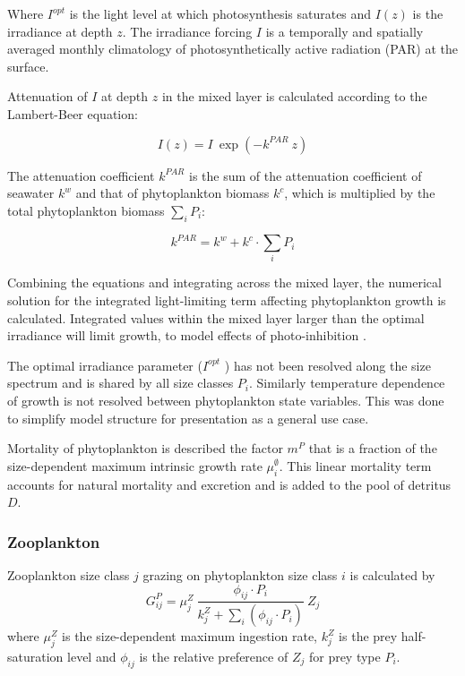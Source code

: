 \documentclass[journal abbreviations, manuscript]{copernicus}
\begin{document}
Where $I^{opt}$ is the light level at which photosynthesis saturates and $I(z)$ is the irradiance at depth $z$.
The irradiance forcing $I$ is a temporally and spatially averaged monthly climatology of photosynthetically active radiation (PAR) at the surface. 

Attenuation of $I$ at depth $z$ in the mixed layer is calculated according to the Lambert-Beer equation:

\begin{equation}
    I(z) = I \ \exp{(-k^{PAR} \ z)} \label{beer1}
\end{equation}

The attenuation coefficient $k^{PAR}$ is the sum of the attenuation coefficient of seawater $k^w$ and that of phytoplankton biomass $k^c$, which is multiplied by the total phytoplankton biomass $\sum_i P_i$:

\begin{equation}
    k^{PAR} = k^w + k^c \cdot \sum_i P_i
\end{equation}

Combining the equations and integrating across the mixed layer, the numerical solution for the integrated light-limiting term affecting phytoplankton growth is calculated. Integrated values within the mixed layer larger than the optimal irradiance will limit growth, to model effects of photo-inhibition \citep{Steele1962EnvironmentalSea}.

The optimal irradiance parameter ($I^{opt}$ ) has not been resolved along the size spectrum and is shared by all size classes $P_i$. Similarly temperature dependence of growth is not resolved between phytoplankton state variables. This was done to simplify model structure for presentation as a general use case. 

Mortality of phytoplankton is described the factor $m^P$ that is a fraction of the size-dependent maximum intrinsic growth rate $\mu_i^{\emptyset}$. This linear mortality term accounts for natural mortality and excretion and is added to the pool of detritus $D$.

\subsubsection{Zooplankton}

Zooplankton size class $j$ grazing on phytoplankton size class $i$ is calculated by
\begin{equation}
    G_{ij}^P = \mu_j^Z \ \frac{ \phi_{ij} \cdot P_i }{ k_j^Z + \sum_{i}(\phi_{ij} \cdot P_i) } \ Z_j
\end{equation}
where $\mu_j^Z$ is the size-dependent maximum ingestion rate, $k_j^Z$ is the prey half-saturation level and $\phi_{ij}$ is the relative preference of $Z_j$ for prey type $P_i$.
\end{document}
